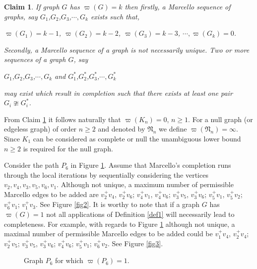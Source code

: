 \documentclass[12pt]{amsart}
\numberwithin{equation}{section}
\newtheorem{claim}[theorem]{Claim}
\numberwithin{equation}{section}
\begin{document}
\begin{claim}\label{clm1}
If graph $G$ has $\varpi(G) = k$ then firstly, a Marcello sequence of graphs, say $G_1$,$G_2$,$G_3$,$\cdots, G_k$ exists such that,
\begin{center}
$\varpi(G_1) = k-1$, $\varpi(G_2) = k-2$, $\varpi(G_3) = k-3$, $\cdots, \varpi(G_k) = 0$.
\end{center}
Secondly, a Marcello sequence of a graph is not necessarily unique. Two or more sequences of a graph $G$, say
\begin{center}
$G_1$,$G_2$,$G_3$,$\cdots, G_k$ and $G^*_1$,$G^*_2$,$G^*_3$,$\cdots, G^*_k$
\end{center}
may exist which result in completion such that there exists at least one pair $G_i \ncong G^*_i$. 
\end{claim}
From Claim \ref{clm1} it follows naturally that $\varpi(K_n) = 0$, $n \geq 1$. For a null graph (or edgeless graph) of order $n \geq 2$ and denoted by $\mathfrak{N}_n$ we define $\varpi(\mathfrak{N}_n) = \infty$. Since $K_1$ can be considered as complete or null the unambiguous lower bound $n \geq 2$ is required for the null graph.

Consider the path $P_6$ in Figure \ref{fig1}. Assume that Marcello's completion runs through the local iterations by sequentially considering the vertices $v_2, v_4, v_3, v_5, v_6, v_1$. Although not unique, a maximum number of permissible Marcello edges to be added are $v^+_2v_4$, $v^+_2v_6$; $v^+_4v_1$, $v^+_4v_6$; $v^+_3v_5$, $v^+_3v_6$; $v^+_5v_1$, $v^+_5v_2$; $v^+_6v_1$; $v^+_1v_3$. See Figure \ref{fig2}. It is worthy to note that if a graph $G$ has $\varpi(G) = 1$ not all applications of Definition \ref{def1} will necessarily lead to completeness. For example, with regards to Figure \ref{fig1} although not unique, a maximal number of permissible Marcello edges to be added could be $v^+_1v_4$, $v^+_2v_4$; $v^+_2v_5$; $v^+_3v_5$, $v^+_3v_6$; $v^+_4v_6$; $v^+_5v_1$; $v^+_6v_2$. See Figure \ref{fig3}.

\begin{figure}[h]
\centering
{}
\caption{Graph $P_6$ for which $\varpi(P_6) = 1.$}\label{fig1}
\end{figure}
\end{document}
